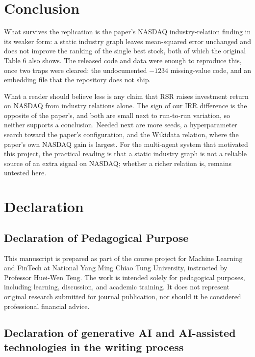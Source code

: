 \documentclass[12pt]{article}
\begin{document}
\section{Conclusion}
\label{sec:conclusion}

What survives the replication is the paper's NASDAQ industry-relation finding in its weaker
form: a static industry graph leaves mean-squared error unchanged and does not improve the
ranking of the single best stock, both of which the original Table 6 also shows. The released
code and data were enough to reproduce this, once two traps were cleared: the undocumented
$-1234$ missing-value code, and an embedding file that the repository does not ship.

What a reader should believe less is any claim that RSR raises investment return on NASDAQ from
industry relations alone. The sign of our IRR difference is the opposite of the paper's, and
both are small next to run-to-run variation, so neither supports a conclusion. Needed next are
more seeds, a hyperparameter search toward the paper's configuration, and the Wikidata relation,
where the paper's own NASDAQ gain is largest. For the multi-agent system that motivated this
project, the practical reading is that a static industry graph is not a reliable source of an
extra signal on NASDAQ; whether a richer relation is, remains untested here.


\section*{Declaration}

\subsection*{Declaration of Pedagogical Purpose}

This manuscript is prepared as part of the course project for Machine Learning and
FinTech at National Yang Ming Chiao Tung University, instructed by Professor
Huei-Wen Teng. The work is intended solely for pedagogical purposes, including
learning, discussion, and academic training. It does not represent original research
submitted for journal publication, nor should it be considered professional financial
advice.

\subsection*{Declaration of generative AI and AI-assisted technologies in the writing process}
\end{document}
